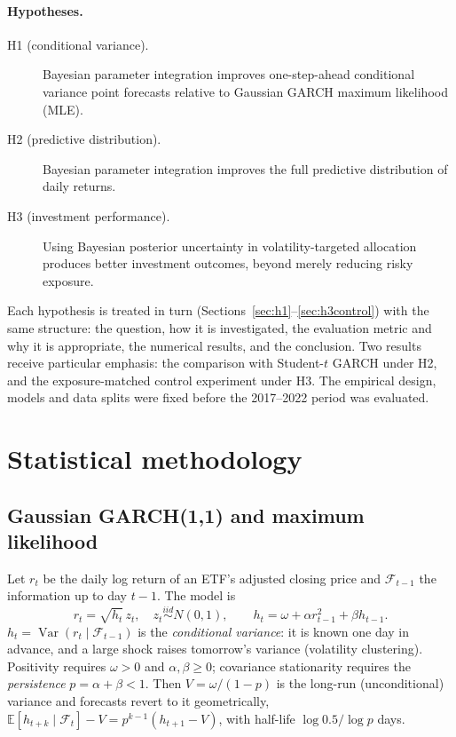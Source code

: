 \documentclass[11pt]{article}
\newcommand{\E}{\mathbb{E}}
\newcommand{\Var}{\operatorname{Var}}
\begin{document}
\paragraph{Hypotheses.}
\begin{description}
\item[H1 (conditional variance).] Bayesian parameter integration improves one-step-ahead conditional variance point
forecasts relative to Gaussian GARCH maximum likelihood (MLE).
\item[H2 (predictive distribution).] Bayesian parameter integration improves the full predictive distribution of
daily returns.
\item[H3 (investment performance).] Using Bayesian posterior uncertainty in volatility-targeted allocation produces
better investment outcomes, beyond merely reducing risky exposure.
\end{description}
\noindent Each hypothesis is treated in turn (Sections~\ref{sec:h1}--\ref{sec:h3control}) with the same structure:
the question, how it is investigated, the evaluation metric and why it is appropriate, the numerical results, and
the conclusion. Two results receive particular emphasis: the comparison with Student-$t$ GARCH under H2, and the
exposure-matched control experiment under H3. The empirical design, models and data splits were fixed before the
2017--2022 period was evaluated.

\section{Statistical methodology}\label{sec:method}
\subsection{Gaussian GARCH(1,1) and maximum likelihood}
Let $r_t$ be the daily log return of an ETF's adjusted closing price and $\mathcal F_{t-1}$ the information up to
day $t-1$. The model is
\begin{equation}\label{eq:garch}
r_t=\sqrt{h_t}\,z_t,\quad z_t\overset{iid}{\sim}N(0,1),\qquad h_t=\omega+\alpha r_{t-1}^2+\beta h_{t-1}.
\end{equation}
$h_t=\Var(r_t\mid\mathcal F_{t-1})$ is the \emph{conditional variance}: it is known one day in advance, and a large
shock raises tomorrow's variance (volatility clustering). Positivity requires $\omega>0$ and $\alpha,\beta\ge0$;
covariance stationarity requires the \emph{persistence} $p=\alpha+\beta<1$. Then $V=\omega/(1-p)$ is the long-run
(unconditional) variance and forecasts revert to it geometrically,
$\E[h_{t+k}\mid\mathcal F_t]-V=p^{k-1}(h_{t+1}-V)$, with half-life $\log 0.5/\log p$ days.
\end{document}
